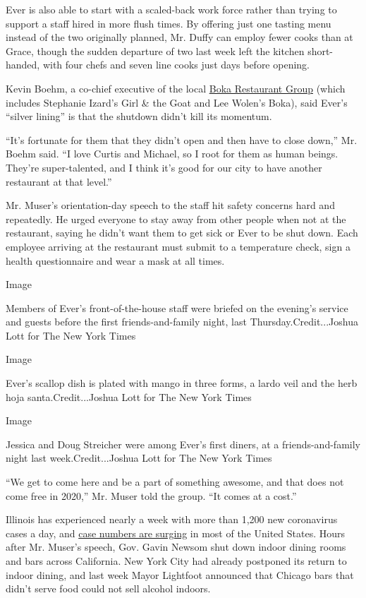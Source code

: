 Ever is also able to start with a scaled-back work force rather than
trying to support a staff hired in more flush times. By offering just
one tasting menu instead of the two originally planned, Mr. Duffy can
employ fewer cooks than at Grace, though the sudden departure of two
last week left the kitchen short-handed, with four chefs and seven line
cooks just days before opening.

Kevin Boehm, a co-chief executive of the local
\href{https://www.bokagrp.com/}{Boka Restaurant Group} (which includes
Stephanie Izard's Girl \& the Goat and Lee Wolen's Boka), said Ever's
``silver lining'' is that the shutdown didn't kill its momentum.

``It's fortunate for them that they didn't open and then have to close
down,'' Mr. Boehm said. ``I love Curtis and Michael, so I root for them
as human beings. They're super-talented, and I think it's good for our
city to have another restaurant at that level.''

Mr. Muser's orientation-day speech to the staff hit safety concerns hard
and repeatedly. He urged everyone to stay away from other people when
not at the restaurant, saying he didn't want them to get sick or Ever to
be shut down. Each employee arriving at the restaurant must submit to a
temperature check, sign a health questionnaire and wear a mask at all
times.

Image

Members of Ever's front-of-the-house staff were briefed on the evening's
service and guests before the first friends-and-family night, last
Thursday.Credit...Joshua Lott for The New York Times

Image

Ever's scallop dish is plated with mango in three forms, a lardo veil
and the herb hoja santa.Credit...Joshua Lott for The New York Times

Image

Jessica and Doug Streicher were among Ever's first diners, at a
friends-and-family night last week.Credit...Joshua Lott for The New York
Times

``We get to come here and be a part of something awesome, and that does
not come free in 2020,'' Mr. Muser told the group. ``It comes at a
cost.''

Illinois has experienced nearly a week with more than 1,200 new
coronavirus cases a day, and
\href{https://slack-redir.net/link?url=https\%3A\%2F\%2Fwww.nytimes3xbfgragh.onion\%2Finteractive\%2F2020\%2Fus\%2Fcoronavirus-us-cases.html\%23states}{case
numbers are surging} in most of the United States. Hours after Mr.
Muser's speech, Gov. Gavin Newsom shut down indoor dining rooms and bars
across California. New York City had already postponed its return to
indoor dining, and last week Mayor Lightfoot announced that Chicago bars
that didn't serve food could not sell alcohol indoors.

